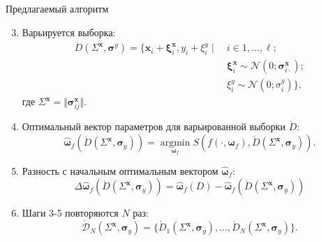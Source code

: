 \documentclass{beamer}
\begin{document}
\begin{frame}{Предлагаемый алгоритм}
  \begin{enumerate}
    \setcounter{enumi}{2}
    \item Варьируется выборка:
      \begin{align*}
        \acute{D}(\Sigma^{\mathbf{x}}, \boldsymbol{\sigma}^y) = \{ \mathbf{x}_i + \boldsymbol{\xi}^{\mathbf{x}}_i, y_i + \xi^y_i \mid\ &i \in 1, \dots, \ell;\\
        & \boldsymbol{\xi}^{\mathbf{x}}_i \sim \mathcal{N}(0; \boldsymbol{\sigma}^{\mathbf{x}}_{i \cdot}); \\
        & \xi^y_i \sim \mathcal{N}(0; \sigma^y_i) \},
      \end{align*}
      где $\Sigma^{\mathbf{x}} = \Vert \boldsymbol{\sigma}^{\mathbf{x}}_{ij} \Vert$.
    \item Оптимальный вектор параметров для варьированной выборки $\acute{D}$:
      \[
    		\hat{\boldsymbol{\omega}}_f (\acute{D} (\Sigma^{\mathbf{x}}, \boldsymbol{\sigma}_y)) = \mathop{\arg \min}\limits_{\boldsymbol{\omega}_f} S (f (\cdot, \boldsymbol{\omega}_f), \acute{D} (\Sigma^{\mathbf{x}}, \boldsymbol{\sigma}_y)).
      \]
    \item Разность с начальным оптимальным вектором $\hat{\boldsymbol{\omega}}_f$:
      \[
        \Delta\hat{\boldsymbol{\omega}}_f(\acute{D} (\Sigma^{\mathbf{x}}, \boldsymbol{\sigma}_y) ) = \hat{\boldsymbol{\omega}}_f(D) - \hat{\boldsymbol{\omega}}_f (\acute{D} (\Sigma^{\mathbf{x}}, \boldsymbol{\sigma}_y))
      \]
     \item Шаги 3-5 повторяются $N$ раз:
      \[
        \acute{\mathcal{D}}_N (\Sigma^{\mathbf{x}}, \boldsymbol{\sigma}_y) = \{ \acute{D}_1 (\Sigma^{\mathbf{x}}, \boldsymbol{\sigma}_y), \dots, \acute{D}_N (\Sigma^{\mathbf{x}}, \boldsymbol{\sigma}_y) \}.
      \]
   \end{enumerate}
\end{frame}
\end{document}
